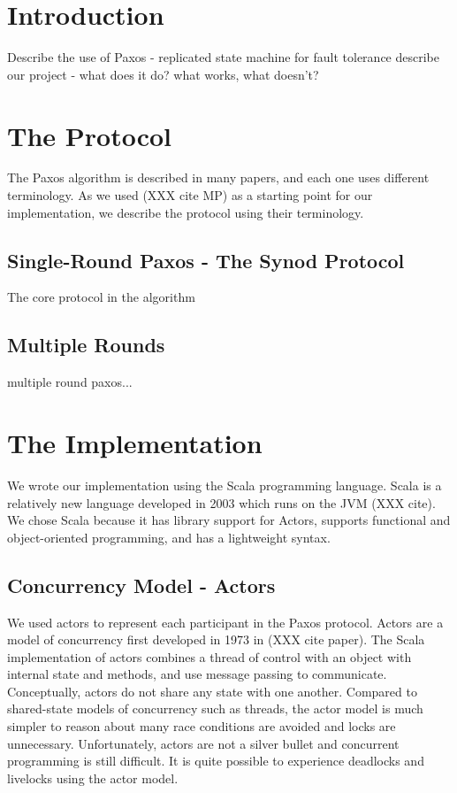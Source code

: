 \documentclass{sig-alternate}
\begin{document}
%
%

\section{Introduction}
Describe the use of Paxos - replicated state machine for fault tolerance
describe our project - what does it do? what works, what doesn't?


\section{The Protocol}

The Paxos algorithm is described in many papers, and each one uses different terminology. As we used (XXX cite MP) as a starting point for our implementation, we describe the protocol using their terminology.

\subsection{Single-Round Paxos - The Synod Protocol}
The core protocol in the algorithm 



\subsection{Multiple Rounds}
multiple round paxos...

\section{The Implementation}

We wrote our implementation using the Scala programming language. Scala is a relatively new language developed in 2003 which runs on the JVM (XXX cite). We chose Scala because it has library support for Actors, supports functional and object-oriented programming, and has a lightweight syntax. 

\subsection{Concurrency Model - Actors}
We used actors to represent each participant in the Paxos protocol. Actors are a model of concurrency first developed in 1973 in (XXX cite paper). The Scala implementation of actors combines a thread of control with an object with internal state and methods, and use message passing to communicate. Conceptually, actors do not share any state with one another. Compared to shared-state models of concurrency such as threads, the actor model is much simpler to reason about many race conditions are avoided and locks are unnecessary. Unfortunately, actors are not a silver bullet and concurrent programming is still difficult. It is quite possible to experience deadlocks and livelocks using the actor model.
\end{document}
